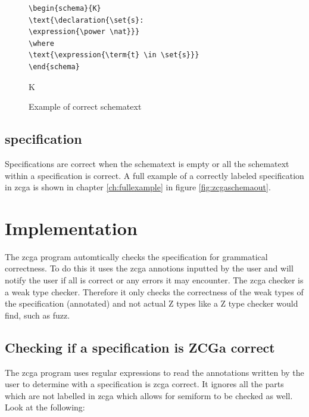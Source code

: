 \begin{figure}[H]
\centering
\begin{minipage}{0.45\textwidth}
\begin{BVerbatim}
\begin{schema}{K}
\text{\declaration{\set{s}:
\expression{\power \nat}}}
\where
\text{\expression{\term{t} \in \set{s}}}
\end{schema}
\end{BVerbatim}
\end{minipage}\hfill
\begin{minipage}{0.45\textwidth}
\begin{schema}{K}
\where
{}
\end{schema}
\end{minipage}
\caption{Example of correct schematext \label{fig:stinzcga}}
\end{figure}

\subsection{specification}

Specifications are correct when the schematext is empty or all the schematext
within a specification is correct. A full example of a correctly labeled
specification in \gls{zcga} is shown in chapter \ref{ch:fullexample} in figure
\ref{fig:zcgaschemaout}.

\section{Implementation}

The \gls{zcga} program automtically checks the specification for grammatical
correctness. To do this it uses the \gls{zcga} annotions inputted by the user
and will notify the user if all is correct or any errors it may encounter. The
\gls{zcga} checker is a weak type checker. Therefore it only checks the
correctness of the weak types of the specification (annotated) and not actual Z
types like a Z type checker would find, such as fuzz.

\subsection{Checking if a specification is ZCGa correct}

The \gls{zcga} program uses regular expressions to read the annotations written
by the user to determine with a specification is \gls{zcga} correct. It ignores
all the parts which are not labelled in \gls{zcga} which allows for
\gls{semiform} to be checked as well. Look at the following:

